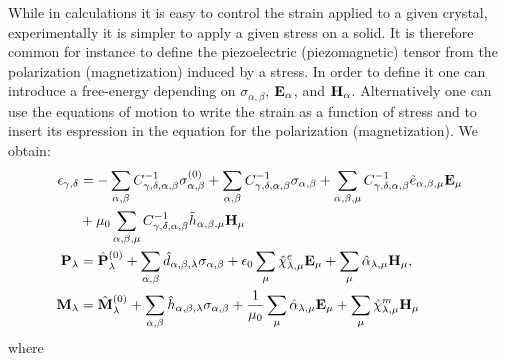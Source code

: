 \documentclass[12pt,a4paper]{article}
\begin{document}
While in calculations it is easy to control the strain applied to
a given crystal, experimentally it is simpler to apply a given stress
on a solid. It is therefore common for instance to define the 
piezoelectric (piezomagnetic) tensor from the polarization 
(magnetization) induced by a stress. In order to define it one 
can introduce a free-energy depending on $\sigma_{\alpha,\beta}$,
${\bf E}_\alpha$, and ${\bf H}_\alpha$. Alternatively one can use the
equations of motion to write the strain as a function of stress and
to insert its espression in the equation for the polarization
(magnetization). We obtain:
\begin{align}
\epsilon_{\gamma,\delta} &= 
- \sum_{\alpha,\beta} 
C^{-1}_{\gamma,\delta,\alpha,\beta} \sigma^{(0)}_{\alpha,\beta} 
+ \sum_{\alpha,\beta} 
C^{-1}_{\gamma,\delta,\alpha,\beta} \sigma_{\alpha,\beta} 
+ \sum_{\alpha,\beta,\mu} 
C^{-1}_{\gamma,\delta,\alpha,\beta} \tilde e_{\alpha,\beta,\mu} {\bf E}_\mu 
\nonumber \\
&+ \mu_0 \sum_{\alpha,\beta,\mu} 
C^{-1}_{\gamma,\delta,\alpha,\beta} \tilde h_{\alpha,\beta,\mu} {\bf H}_\mu 
\\
{\bf P}_{\lambda}&= \hat {\bf P}^{(0)}_{\lambda}
+\sum_{\alpha,\beta} \hat d_{\alpha,\beta,\lambda} 
\sigma_{\alpha,\beta} +
\epsilon_0 \sum_{\mu} 
\hat \chi^e_{\lambda,\mu}
{\bf E}_{\mu} +
\sum_{\mu} \hat \alpha_{\lambda,\mu} 
{\bf H}_{\mu}, \\
{\bf M}_{\lambda}&= \hat {\bf M}^{(0)}_{\lambda}
+\sum_{\alpha,\beta} \hat h_{\alpha,\beta,\lambda} 
\sigma_{\alpha,\beta} +
{1\over \mu_0} \sum_{\mu} \hat \alpha_{\lambda,\mu} 
{\bf E}_{\mu}+
\sum_{\mu} 
\hat \chi^m_{\lambda,\mu}
{\bf H}_{\mu}
\end{align} 
where
\end{document}
